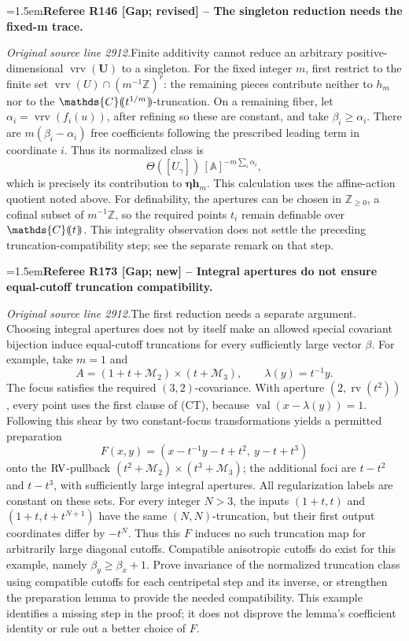 \documentclass[12pt]{amsart}
\newcommand{\RefereeRemark}[4]{%
  \par\medskip\begingroup\normalfont\small\color{RefereePurple}%
  \emergencystretch=1.5em\noindent\textbf{Referee R#1 [#2] -- #3.}\par\nobreak\noindent #4\par
  \endgroup\medskip
}
\theoremstyle{plain}
\theoremstyle{definition}
\theoremstyle{remark}
\numberwithin{equation}{section}
\theoremstyle{plain}
\newcommand{\RV}{\textup{RV}}
\newcommand{\MM}{\mdl M}
\newcommand{\Z}{\mathds{Z}}
\newcommand{\A}{\mathds{A}}
\newcommand{\C}{\mathds{C}}
\newcommand{\0}{\emptyset}
\newcommand{\dpar}[1]{%
   (\mkern-4mu (#1 )\mkern-4mu )}
\newcommand{\mdl}[1]{\mathcal{#1}}  %
\DeclareMathOperator{\rv}{rv}
\DeclareMathOperator{\vv}{val}
\DeclareMathOperator{\vrv}{vrv}
\begin{document}
\RefereeRemark{146}{Gap; revised}{The singleton reduction needs the fixed-m trace}{%
\textit{Original source line 2912.}\quad Finite additivity cannot reduce an arbitrary positive-dimensional $\vrv(\bm U)$ to a singleton. For the fixed integer $m$, first restrict to the finite set $\vrv(U)\cap(m^{-1}\Z)^r$: the remaining pieces contribute neither to $h_m$ nor to the $\C\dpar{t^{1/m}}$-truncation. On a remaining fiber, let $\alpha_i=\vrv(f_i(u))$, after refining so these are constant, and take $\beta_i\geq\alpha_i$. There are $m(\beta_i-\alpha_i)$ free coefficients following the prescribed leading term in coordinate $i$. Thus its normalized class is
\[
 \Theta([U_\gamma])\,[\A]^{-m\sum_i\alpha_i},
\]
which is precisely its contribution to $\bm\eta\bm h_m$. This calculation uses the affine-action quotient noted above. For definability, the apertures can be chosen in $\Z_{\geq0}$, a cofinal subset of $m^{-1}\Z$, so the required points $t_i$ remain definable over $\C\dpar t$. This integrality observation does not settle the preceding truncation-compatibility step; see the separate remark on that step.
}

\RefereeRemark{173}{Gap; new}{Integral apertures do not ensure equal-cutoff truncation compatibility}{%
\textit{Original source line 2912.}\quad The first reduction needs a separate argument. Choosing integral apertures does not by itself make an allowed special covariant bijection induce equal-cutoff truncations for every sufficiently large vector $\beta$. For example, take $m=1$ and
\[
 A=(1+t+\MM_2)\times(t+\MM_3),\qquad \lambda(y)=t^{-1}y.
\]
The focus satisfies the required $(3,2)$-covariance. With aperture $(2,\rv(t^2))$, every point uses the first clause of (CT), because $\vv(x-\lambda(y))=1$. Following this shear by two constant-focus transformations yields a permitted preparation
\[
 F(x,y)=(x-t^{-1}y-t+t^2,\ y-t+t^3)
\]
onto the $\RV$-pullback $(t^2+\MM_2)\times(t^3+\MM_3)$; the additional foci are $t-t^2$ and $t-t^3$, with sufficiently large integral apertures. All regularization labels are constant on these sets. For every integer $N>3$, the inputs $(1+t,t)$ and $(1+t,t+t^{N+1})$ have the same $(N,N)$-truncation, but their first output coordinates differ by $-t^N$. Thus this $F$ induces no such truncation map for arbitrarily large diagonal cutoffs. Compatible anisotropic cutoffs do exist for this example, namely $\beta_y\geq\beta_x+1$. Prove invariance of the normalized truncation class using compatible cutoffs for each centripetal step and its inverse, or strengthen the preparation lemma to provide the needed compatibility. This example identifies a missing step in the proof; it does not disprove the lemma's coefficient identity or rule out a better choice of $F$.
}
\end{document}
